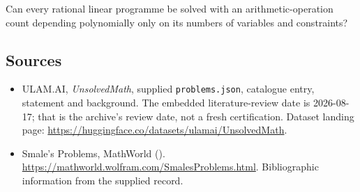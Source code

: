 \documentclass[11pt,a4paper]{article}
\begin{document}
Can every rational linear programme be solved with an arithmetic-operation count depending polynomially only on its numbers of variables and constraints?

\subsection{Sources}

{\small

\begin{itemize}

\item[\hypertarget{source:statement:1}{S1}] ULAM.AI, \emph{UnsolvedMath}, supplied \texttt{problems.json}, catalogue entry, statement and background. The embedded literature-review date is 2026-08-17; that is the archive’s review date, not a fresh certification. Dataset landing page: \url{https://huggingface.co/datasets/ulamai/UnsolvedMath}.

\item[\hypertarget{source:statement:2}{S2}] Smale's Problems, MathWorld (). \url{https://mathworld.wolfram.com/SmalesProblems.html}. Bibliographic information from the supplied record.

\end{itemize}

}

\label{end:statement}
\end{document}
